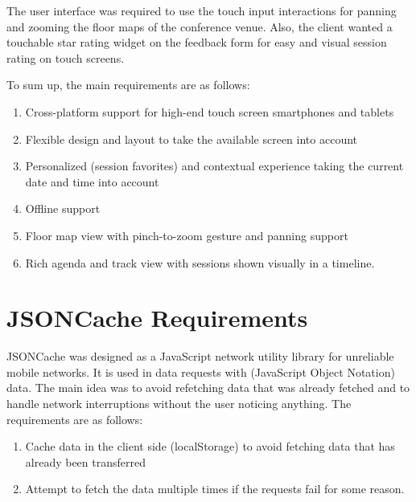 The user interface was required to use the touch input interactions
for panning and zooming the floor maps of the conference venue. Also,
the client wanted a touchable star rating widget on the feedback form
for easy and visual session rating on touch screens.

To sum up, the main requirements are as follows:

\begin{enumerate}
\item Cross-platform support for high-end touch screen smartphones and
  tablets
\item Flexible design and layout to take the available screen into
  account
\item Personalized (session favorites) and contextual experience
  taking the current date and time into account
\item Offline support
\item Floor map view with pinch-to-zoom gesture and panning support
\item Rich agenda and track view with sessions shown visually in a
  timeline.
\end{enumerate}

\section{JSONCache Requirements}
\label{section:jsoncache-requirements}

JSONCache was designed as a JavaScript network utility library for
unreliable mobile networks. It is used in  data requests
with  (JavaScript Object Notation) data. The main idea was
to avoid refetching data that was already fetched and to handle
network interruptions without the user noticing anything. The
requirements are as follows:
\begin{enumerate}[resume]
\item Cache data in the client side (localStorage) to avoid fetching
  data that has already been transferred
\item Attempt to fetch the data multiple times if the requests fail
  for some reason.
\end{enumerate}
